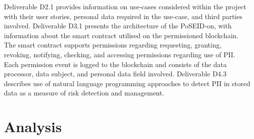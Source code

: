 Deliverable D2.1 \cite{noauthor_poseid-on_d2.1-use-cases-analysis-and-user-scenarios-v1.00.pdf_nodate} provides information on use-cases considered within the project with their user stories, personal data required in the use-case, and third parties involved. Deliverable D3.1 \cite{noauthor_d3.1_final-version_poseidon_v10.pdf_nodate} presents the architecture of the PoSEID-on, with information about the smart contract utilised on the permissioned blockchain. The smart contract supports permissions regarding requesting, granting, revoking, notifying, checking, and accessing permissions regarding use of PII. Each permission event is logged to the blockchain and consists of the data processor, data subject, and personal data field involved. Deliverable D4.3 \cite{noauthor_d4.3-rmm-and-pda-v1.0-final.pdf_nodate} describes use of natural language programming approaches to detect PII in stored data as a measure of risk detection and management.

\section{Analysis}\label{sec:sota:analysis}

